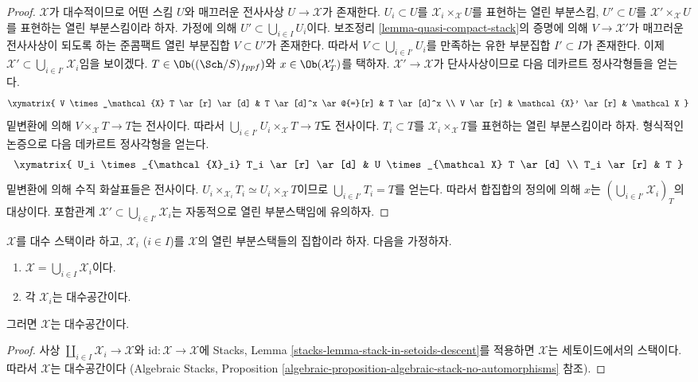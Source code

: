 \begin{proof}
$\mathcal X$가 대수적이므로 어떤 스킴 $U$와 매끄러운 전사사상
$U \to \mathcal X$가 존재한다. $U_i \subset U$를
$\mathcal{X}_i \times_{\mathcal X} U$를 표현하는 열린 부분스킴,
$U' \subset U$를 $\mathcal{X}' \times_{\mathcal X} U$를 표현하는
열린 부분스킴이라 하자. 가정에 의해 $U'\subset \bigcup_{i\in I} U_i$이다.
보조정리 \ref{lemma-quasi-compact-stack}의 증명에 의해
$V \to \mathcal{X}'$가 매끄러운 전사사상이 되도록 하는 준콤팩트 열린
부분집합 $V \subset U'$가 존재한다. 따라서
$V \subset \bigcup_{i \in I'} U_i$를 만족하는 유한 부분집합
$I' \subset I$가 존재한다. 이제
$\mathcal{X}' \subset \bigcup_{i \in I'} \mathcal{X}_i$임을 보이겠다.
$T \in \Ob((\Sch/S)_{fppf})$와
$x \in \Ob(\mathcal{X}'_T)$를 택하자.
$\mathcal{X}' \to \mathcal{X}$가 단사사상이므로 다음 데카르트 정사각형들을 얻는다.
$$
\xymatrix{
V \times_\mathcal{X} T \ar[r] \ar[d] &
T \ar[d]^x \ar@{=}[r] &
T \ar[d]^x \\
V \ar[r] &
\mathcal{X}' \ar[r] &
\mathcal X
}
$$
밑변환에 의해 $V \times_{\mathcal X} T \to T$는 전사이다. 따라서
$\bigcup_{i \in I'} U_i \times_{\mathcal X} T \to T$도 전사이다.
$T_i \subset T$를 $\mathcal{X}_i \times_{\mathcal X} T$를 표현하는
열린 부분스킴이라 하자. 형식적인 논증으로 다음 데카르트 정사각형을 얻는다.
$$
\xymatrix{
U_i \times_{\mathcal{X}_i} T_i \ar[r] \ar[d] &
U \times_{\mathcal X} T \ar[d] \\
T_i \ar[r] & T
}
$$
밑변환에 의해 수직 화살표들은 전사이다.
$U_i \times_{\mathcal{X}_i} T_i \simeq U_i \times_{\mathcal X} T$이므로
$\bigcup_{i \in I'} T_i = T$를 얻는다. 따라서 합집합의 정의에 의해
$x$는 $(\bigcup_{i\in I'} \mathcal{X}_i)_T$의 대상이다.
포함관계 $\mathcal{X}' \subset \bigcup_{i \in I'} \mathcal{X}_i$는
자동적으로 열린 부분스택임에 유의하자.
\end{proof}

\begin{lemma}
\label{lemma-zariski-open-cover-stack-is-space}
$\mathcal X$를 대수 스택이라 하고, $\mathcal{X}_i$ ($i \in I$)를
$\mathcal{X}$의 열린 부분스택들의 집합이라 하자. 다음을 가정하자.
\begin{enumerate}
\item $\mathcal{X} = \bigcup_{i \in I} \mathcal{X}_i$이다.
\item 각 $\mathcal{X}_i$는 대수공간이다.
\end{enumerate}
그러면 $\mathcal{X}$는 대수공간이다.
\end{lemma}

\begin{proof}
사상 $\coprod_{i \in I} \mathcal{X}_i \to \mathcal{X}$와
$\text{id} : \mathcal{X} \to \mathcal{X}$에
Stacks, Lemma \ref{stacks-lemma-stack-in-setoids-descent}를 적용하면
$\mathcal{X}$는 세토이드에서의 스택이다. 따라서 $\mathcal{X}$는 대수공간이다
(Algebraic Stacks,
Proposition \ref{algebraic-proposition-algebraic-stack-no-automorphisms} 참조).
\end{proof}

